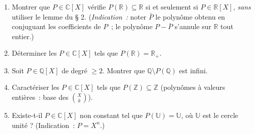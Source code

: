 \begin{mdframed}[style=exobar]
  \begin{enumerate}
    \item Montrer que $P \in \mathbb{C}[X]$ vérifie $P(\mathbb{R}) \subseteq \mathbb{R}$
          si et seulement si $P \in \mathbb{R}[X]$, \emph{sans} utiliser le lemme
          du § 2. (\textit{Indication~:} noter $\bar{P}$ le polynôme obtenu en
          conjuguant les coefficients de $P$~; le polynôme $P - \bar{P}$
          s'annule sur $\mathbb{R}$ tout entier.)
    \item Déterminer les $P \in \mathbb{C}[X]$ tels que $P(\mathbb{R}) = \mathbb{R}_+$.
    \item Soit $P \in \mathbb{Q}[X]$ de degré $\geq 2$. Montrer que
          $\mathbb{Q} \setminus P(\mathbb{Q})$ est infini.
    \item Caractériser les $P \in \mathbb{C}[X]$ tels que $P(\mathbb{Z}) \subseteq \mathbb{Z}$
          (polynômes à valeurs entières~: base des $\binom{X}{k}$).
    \item Existe-t-il $P \in \mathbb{C}[X]$ non constant tel que
          $P(\mathbb{U}) = \mathbb{U}$, où $\mathbb{U}$ est le cercle unité ?
          (Indication~: $P = X^n$.)
  \end{enumerate}
\end{mdframed}

